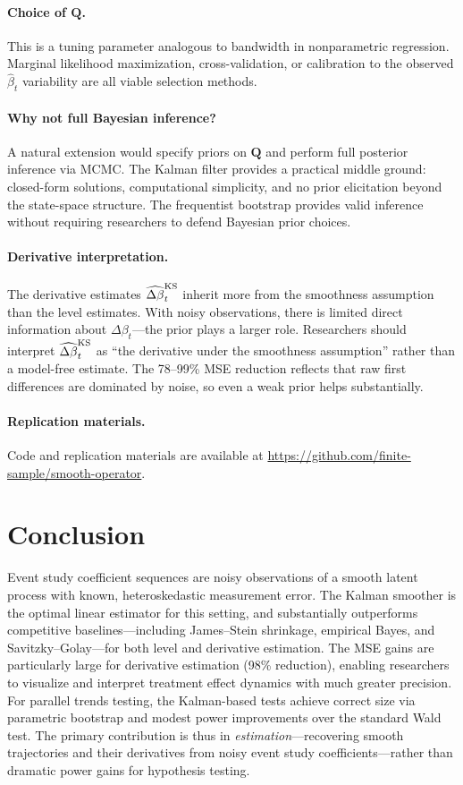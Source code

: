\documentclass[12pt]{article}
\begin{document}
\paragraph{Choice of $\mathbf{Q}$.} This is a tuning parameter analogous to bandwidth in nonparametric regression. Marginal likelihood maximization, cross-validation, or calibration to the observed $\hat{\beta}_t$ variability are all viable selection methods.

\paragraph{Why not full Bayesian inference?} A natural extension would specify priors on $\mathbf{Q}$ and perform full posterior inference via MCMC. The Kalman filter provides a practical middle ground: closed-form solutions, computational simplicity, and no prior elicitation beyond the state-space structure. The frequentist bootstrap provides valid inference without requiring researchers to defend Bayesian prior choices.

\paragraph{Derivative interpretation.} The derivative estimates $\widehat{\Delta\beta}^{\rm KS}_t$ inherit more from the smoothness assumption than the level estimates. With noisy observations, there is limited direct information about $\Delta\beta_t$---the prior plays a larger role. Researchers should interpret $\widehat{\Delta\beta}^{\rm KS}_t$ as ``the derivative under the smoothness assumption'' rather than a model-free estimate. The 78--99\% MSE reduction reflects that raw first differences are dominated by noise, so even a weak prior helps substantially.

\paragraph{Replication materials.} Code and replication materials are available at \url{https://github.com/finite-sample/smooth-operator}.

\section{Conclusion}

Event study coefficient sequences are noisy observations of a smooth latent process with known, heteroskedastic measurement error. The Kalman smoother is the optimal linear estimator for this setting, and substantially outperforms competitive baselines---including James--Stein shrinkage, empirical Bayes, and Savitzky--Golay---for both level and derivative estimation. The MSE gains are particularly large for derivative estimation (98\% reduction), enabling researchers to visualize and interpret treatment effect dynamics with much greater precision. For parallel trends testing, the Kalman-based tests achieve correct size via parametric bootstrap and modest power improvements over the standard Wald test. The primary contribution is thus in \emph{estimation}---recovering smooth trajectories and their derivatives from noisy event study coefficients---rather than dramatic power gains for hypothesis testing.



\end{document}

